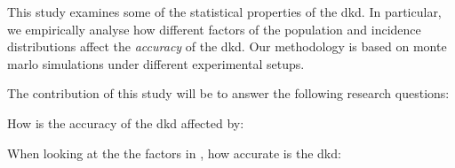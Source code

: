 This study examines some of the statistical properties of the \gls{dkd}.
In particular,
we empirically analyse how different factors of the population and incidence distributions
affect the \textit{accuracy} of the \gls{dkd}.
Our methodology is based on monte marlo simulations under different experimental setups.

The contribution of this study will be to answer the following research questions:

\begin{question}
    \label{thm:accuracy-affected}
    How is the accuracy of the \gls{dkd} affected by:
\end{question}

\begin{question}
    \label{thm:accuracy-scale}
    When looking at the the factors in ,
    how accurate is the \gls{dkd}:
\end{question}

